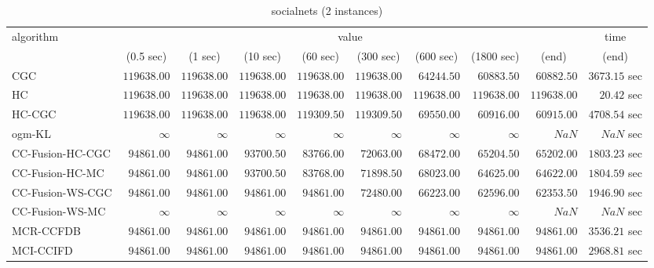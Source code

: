 \begin{table}[H]
\scriptsize
\centering
\caption{socialnets (2 instances)}
\label{tab:anytimetable-socialnets}
\begin{tabular}{lrrrrrrrrr}
\toprule
           algorithm &                                   \multicolumn{8}{c}{value} & \multicolumn{1}{c}{time}   \\  
\cmidrule(lr){2-9}\cmidrule(lr){10-10}   
                     & \multicolumn{1}{c}{(0.5 sec)} & \multicolumn{1}{c}{(1 sec)} & \multicolumn{1}{c}{(10 sec)} & \multicolumn{1}{c}{(60 sec)} & \multicolumn{1}{c}{(300 sec)} & \multicolumn{1}{c}{(600 sec)} & \multicolumn{1}{c}{(1800 sec)} & \multicolumn{1}{c}{(end)} & \multicolumn{1}{c}{(end)}   \\ \midrule 
                 CGC & $    119638.00$ & $    119638.00$ & $    119638.00$ & $    119638.00$ & $    119638.00$ & $     64244.50$ & $     60883.50$ & $     60882.50$ & $      3673.15$ sec   \\ 
                  HC & $    119638.00$ & $    119638.00$ & $    119638.00$ & $    119638.00$ & $    119638.00$ & $    119638.00$ & $    119638.00$ & $    119638.00$ & $        20.42$ sec   \\ 
              HC-CGC & $    119638.00$ & $    119638.00$ & $    119638.00$ & $    119309.50$ & $    119309.50$ & $     69550.00$ & $     60916.00$ & $     60915.00$ & $      4708.54$ sec   \\ 
              ogm-KL & $\infty$ & $\infty$ & $\infty$ & $\infty$ & $\infty$ & $\infty$ & $\infty$ & $          NaN$ & $          NaN$ sec   \\ 
    CC-Fusion-HC-CGC & $     94861.00$ & $     94861.00$ & $     93700.50$ & $     83766.00$ & $     72063.00$ & $     68472.00$ & $     65204.50$ & $     65202.00$ & $      1803.23$ sec   \\ 
     CC-Fusion-HC-MC & $     94861.00$ & $     94861.00$ & $     93700.50$ & $     83768.00$ & $     71898.50$ & $     68023.00$ & $     64625.00$ & $     64622.00$ & $      1804.59$ sec   \\ 
    CC-Fusion-WS-CGC & $     94861.00$ & $     94861.00$ & $     94861.00$ & $     94861.00$ & $     72480.00$ & $     66223.00$ & $     62596.00$ & $     62353.50$ & $      1946.90$ sec   \\ 
     CC-Fusion-WS-MC & $\infty$ & $\infty$ & $\infty$ & $\infty$ & $\infty$ & $\infty$ & $\infty$ & $          NaN$ & $          NaN$ sec   \\ 
\cmidrule{1-1} 
           MCR-CCFDB & $     94861.00$ & $     94861.00$ & $     94861.00$ & $     94861.00$ & $     94861.00$ & $     94861.00$ & $     94861.00$ & $     94861.00$ & $      3536.21$ sec   \\ 
\cmidrule{1-1} 
           MCI-CCIFD & $     94861.00$ & $     94861.00$ & $     94861.00$ & $     94861.00$ & $     94861.00$ & $     94861.00$ & $     94861.00$ & $     94861.00$ & $      2968.81$ sec   \\ 
\bottomrule
\end{tabular}
\end{table}
